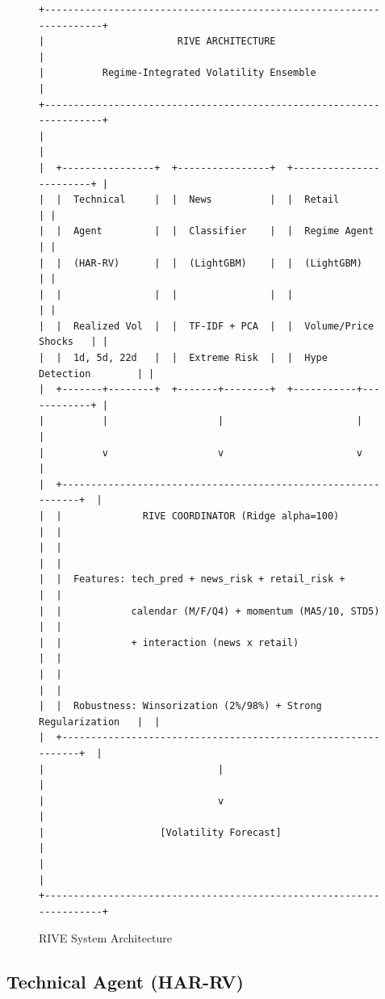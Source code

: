 \documentclass[12pt,a4paper]{article}
\begin{document}
\begin{figure}[H]
\centering
\begin{verbatim}
+---------------------------------------------------------------------+
|                       RIVE ARCHITECTURE                             |
|          Regime-Integrated Volatility Ensemble                      |
+---------------------------------------------------------------------+
|                                                                     |
|  +----------------+  +----------------+  +------------------------+ |
|  |  Technical     |  |  News          |  |  Retail                | |
|  |  Agent         |  |  Classifier    |  |  Regime Agent          | |
|  |  (HAR-RV)      |  |  (LightGBM)    |  |  (LightGBM)            | |
|  |                |  |                |  |                        | |
|  |  Realized Vol  |  |  TF-IDF + PCA  |  |  Volume/Price Shocks   | |
|  |  1d, 5d, 22d   |  |  Extreme Risk  |  |  Hype Detection        | |
|  +-------+--------+  +-------+--------+  +-----------+------------+ |
|          |                   |                       |              |
|          v                   v                       v              |
|  +--------------------------------------------------------------+  |
|  |              RIVE COORDINATOR (Ridge alpha=100)               |  |
|  |                                                               |  |
|  |  Features: tech_pred + news_risk + retail_risk +              |  |
|  |            calendar (M/F/Q4) + momentum (MA5/10, STD5)        |  |
|  |            + interaction (news x retail)                      |  |
|  |                                                               |  |
|  |  Robustness: Winsorization (2%/98%) + Strong Regularization   |  |
|  +--------------------------------------------------------------+  |
|                              |                                      |
|                              v                                      |
|                    [Volatility Forecast]                            |
|                                                                     |
+---------------------------------------------------------------------+
\end{verbatim}
\caption{RIVE System Architecture}
\label{fig:architecture}
\end{figure}

\subsection{Technical Agent (HAR-RV)}
\end{document}
